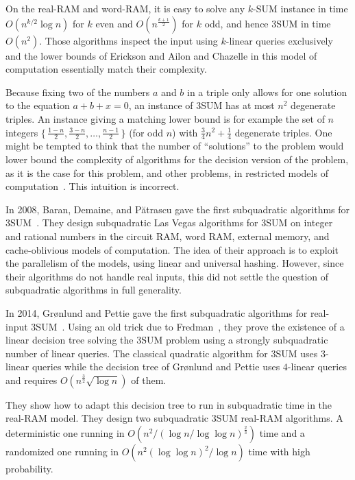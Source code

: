 On the real-RAM and word-RAM,
it is easy to solve any \(k\)-SUM instance in time \(O(n^{k/2} \log n)\) for
\(k\) even and \(O(n^{\frac{k+1}{2}})\) for \(k\) odd,
and hence 3SUM in time \(O(n^2)\). Those algorithms inspect the input using
\(k\)-linear queries exclusively and the lower bounds of Erickson and Ailon and
Chazelle in this model of computation essentially match their complexity.

Because fixing two of the numbers $a$ and $b$ in a triple only allows for one
solution to the equation $a + b + x = 0$, an instance of 3SUM has at most
$n^2$ degenerate triples. An instance giving a matching lower bound is for
example the set
of \(n\) integers
$\{\,\frac{1-n}{2},\frac{3-n}{2},\ldots,\frac{n-1}{2}\,\}$ (for odd $n$)
with $\frac{3}{4} n^2 + \frac 14$ degenerate triples.
%
One might be tempted to think that the number of ``solutions'' to the problem
would lower bound the complexity of algorithms for the decision version of the
problem, as it is the case for this problem, and other problems, in restricted
models of computation~\cite{Er96,Er99a}.
%
This intuition is incorrect.

In 2008, Baran, Demaine, and P{\u a}tra{\cb s}cu
gave the first subquadratic algorithms for
3SUM~\cite{BDP08}. They design subquadratic Las Vegas
algorithms for 3SUM on integer and
rational numbers in the circuit RAM, word RAM, external memory, and
cache-oblivious models of computation. The idea of their approach is to exploit
the parallelism of the models, using linear and universal hashing. However,
since their algorithms do not handle real inputs,
this did not settle the question of subquadratic algorithms in full
generality.

In 2014, Gr{\o}nlund and Pettie gave
the first subquadratic algorithms for real-input 3SUM~\cite{GP18}.
Using an old trick due to Fredman~\cite{Fr76},
they prove the existence of a linear decision tree
solving the 3SUM problem using a strongly subquadratic number of linear queries.
The classical quadratic algorithm for 3SUM uses \(3\)-linear queries
while the decision tree of Gr{\o}nlund and Pettie uses \(4\)-linear queries and
requires $O(n^{\frac{3}{2}} \sqrt{\log n})$ of them.


They show how to adapt this decision tree to run in subquadratic time in the
real-RAM model. They design two subquadratic 3SUM
real-RAM algorithms. A deterministic one running in
$O(n^2/{(\log n/\log \log n)}^{\frac{2}{3}})$
time and a randomized one running in
$O(n^2 {(\log \log n)}^2 / \log n)$ time with high probability.

